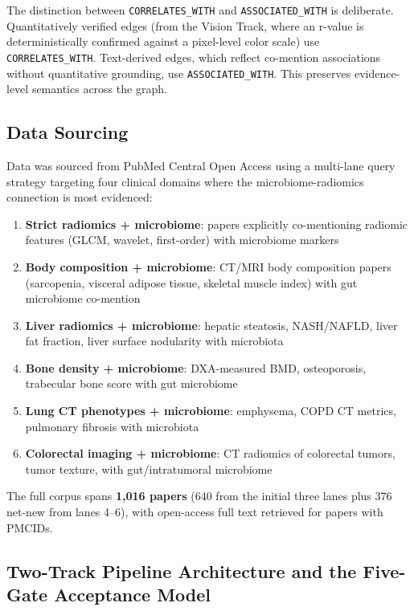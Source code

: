 \documentclass[12pt, letterpaper]{article}
\begin{document}
The distinction between \texttt{CORRELATES\_WITH} and \texttt{ASSOCIATED\_WITH} is deliberate. Quantitatively verified edges (from the Vision Track, where an r-value is deterministically confirmed against a pixel-level color scale) use \texttt{CORRELATES\_WITH}. Text-derived edges, which reflect co-mention associations without quantitative grounding, use \texttt{ASSOCIATED\_WITH}. This preserves evidence-level semantics across the graph.

\subsection{Data Sourcing}

Data was sourced from PubMed Central Open Access using a multi-lane query strategy targeting four clinical domains where the microbiome-radiomics connection is most evidenced:

\begin{enumerate}
    \item \textbf{Strict radiomics + microbiome}: papers explicitly co-mentioning radiomic features (GLCM, wavelet, first-order) with microbiome markers
    \item \textbf{Body composition + microbiome}: CT/MRI body composition papers (sarcopenia, visceral adipose tissue, skeletal muscle index) with gut microbiome co-mention
    \item \textbf{Liver radiomics + microbiome}: hepatic steatosis, NASH/NAFLD, liver fat fraction, liver surface nodularity with microbiota
    \item \textbf{Bone density + microbiome}: DXA-measured BMD, osteoporosis, trabecular bone score with gut microbiome
    \item \textbf{Lung CT phenotypes + microbiome}: emphysema, COPD CT metrics, pulmonary fibrosis with microbiota
    \item \textbf{Colorectal imaging + microbiome}: CT radiomics of colorectal tumors, tumor texture, with gut/intratumoral microbiome
\end{enumerate}

The full corpus spans \textbf{1,016 papers} (640 from the initial three lanes plus 376 net-new from lanes 4--6), with open-access full text retrieved for papers with PMCIDs.

\subsection{Two-Track Pipeline Architecture and the Five-Gate Acceptance Model}
\end{document}
